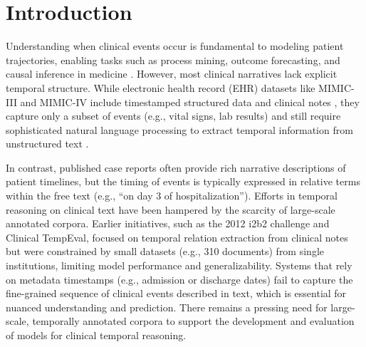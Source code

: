\documentclass[pdflatex,sn-mathphys-num]{sn-jnl}%
\theoremstyle{thmstyleone}%
\theoremstyle{thmstyletwo}%
\theoremstyle{thmstylethree}%
\begin{document}

\maketitle


\section{Introduction}

Understanding when clinical events occur is fundamental to modeling patient trajectories, enabling tasks such as process mining, outcome forecasting, and causal inference in medicine \citep{jensen2012mining, noren2010temporal}.
However, most clinical narratives lack explicit temporal structure. While electronic health record (EHR) datasets like MIMIC-III and MIMIC-IV include timestamped structured data and clinical notes \citep{johnson2016mimic, johnson2023mimic}, they capture only a subset of events (e.g., vital signs, lab results) and still require sophisticated natural language processing to extract temporal information from unstructured text \citep{viani2021temporal, cheng2023typed}.

In contrast, published case reports often provide rich narrative descriptions of patient timelines, but the timing of events is typically expressed in relative terms within the free text (e.g., “on day 3 of hospitalization”).
Efforts in temporal reasoning on clinical text have been hampered by the scarcity of large-scale annotated corpora.
Earlier initiatives, such as the 2012 i2b2 challenge and Clinical TempEval, focused on temporal relation extraction from clinical notes \citep{sun2013evaluating, bethard2016semeval, galvan2018investigating} but were constrained by small datasets (e.g., 310 documents) from single institutions, limiting model performance and generalizability.
Systems that rely on metadata timestamps (e.g., admission or discharge dates) fail to capture the fine-grained sequence of clinical events described in text, which is essential for nuanced understanding and prediction.
There remains a pressing need for large-scale, temporally annotated corpora to support the development and evaluation of models for clinical temporal reasoning.
\end{document}
